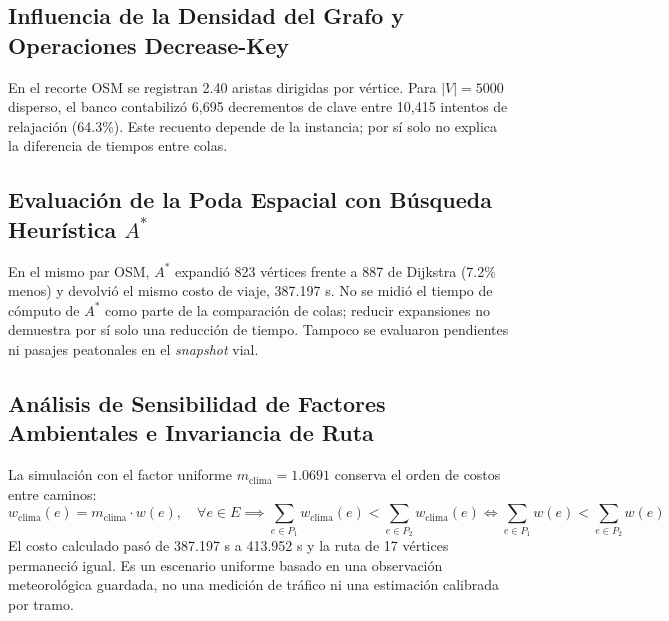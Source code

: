 \subsection{Influencia de la Densidad del Grafo y Operaciones Decrease-Key}
En el recorte OSM se registran 2.40 aristas dirigidas por vértice. Para $|V|=5000$ disperso, el banco contabilizó 6,695 decrementos de clave entre 10,415 intentos de relajación (64.3\%). Este recuento depende de la instancia; por sí solo no explica la diferencia de tiempos entre colas.

\subsection{Evaluación de la Poda Espacial con Búsqueda Heurística \texorpdfstring{$A^*$}{A*}}
En el mismo par OSM, $A^*$ expandió 823 vértices frente a 887 de Dijkstra (7.2\% menos) y devolvió el mismo costo de viaje, 387.197 s. No se midió el tiempo de cómputo de $A^*$ como parte de la comparación de colas; reducir expansiones no demuestra por sí solo una reducción de tiempo. Tampoco se evaluaron pendientes ni pasajes peatonales en el \textit{snapshot} vial.

\subsection{Análisis de Sensibilidad de Factores Ambientales e Invariancia de Ruta}
La simulación con el factor uniforme $m_{\text{clima}} = 1.0691$ conserva el orden de costos entre caminos:
\begin{equation}
    w_{\text{clima}}(e) = m_{\text{clima}} \cdot w(e), \quad \forall e \in E \implies \sum_{e \in P_1} w_{\text{clima}}(e) < \sum_{e \in P_2} w_{\text{clima}}(e) \iff \sum_{e \in P_1} w(e) < \sum_{e \in P_2} w(e)
    \label{eq:invariancia_clima}
\end{equation}
El costo calculado pasó de 387.197 s a 413.952 s y la ruta de 17 vértices permaneció igual. Es un escenario uniforme basado en una observación meteorológica guardada, no una medición de tráfico ni una estimación calibrada por tramo.

